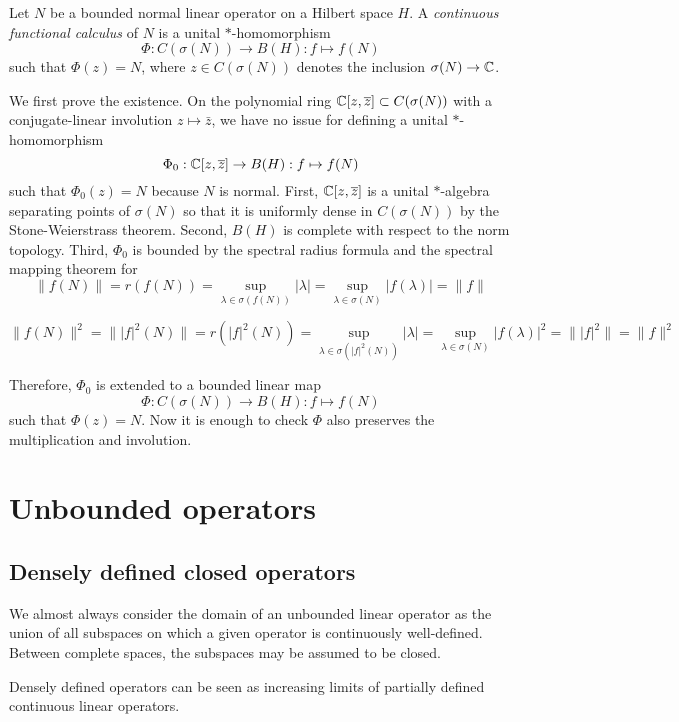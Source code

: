 \documentclass{../../large}
\begin{document}
\begin{prb}
Let $N$ be a bounded normal linear operator on a Hilbert space $H$.
A \emph{continuous functional calculus} of $N$ is a unital $*$-homomorphism
\[\Phi:C(\sigma(N))\to B(H):f\mapsto f(N)\]
such that $\Phi(z)=N$, where $z\in C(\sigma(N))$ denotes the inclusion $\sigma(N)\to\mathbb{C}$.
\end{prb}
\begin{pf}

We first prove the existence.
On the polynomial ring $\mathbb{C}[z,\overline z]\subset C(\sigma(N))$ with a conjugate-linear involution $z\mapsto\bar z$, we have no issue for defining a unital $*$-homomorphism
\[\Phi_0:\mathbb{C}[z,\overline z]\to B(H):f\mapsto f(N)\]
such that $\Phi_0(z)=N$ because $N$ is normal.
First, $\mathbb{C}[z,\overline z]$ is a unital $*$-algebra separating points of $\sigma(N)$ so that it is uniformly dense in $C(\sigma(N))$ by the Stone-Weierstrass theorem.
Second, $B(H)$ is complete with respect to the norm topology.
Third, $\Phi_0$ is bounded by the spectral radius formula and the spectral mapping theorem for 
\[\|f(N)\|=r(f(N))=\sup_{\lambda\in\sigma(f(N))}|\lambda|=\sup_{\lambda\in\sigma(N)}|f(\lambda)|=\|f\|\]

\[\|f(N)\|^2=\||f|^2(N)\|=r(|f|^2(N))=\sup_{\lambda\in\sigma(|f|^2(N))}|\lambda|=\sup_{\lambda\in\sigma(N)}|f(\lambda)|^2=\||f|^2\|=\|f\|^2\]


Therefore, $\Phi_0$ is extended to a bounded linear map
\[\Phi:C(\sigma(N))\to B(H):f\mapsto f(N)\]
such that $\Phi(z)=N$.
Now it is enough to check $\Phi$ also preserves the multiplication and involution.



\end{pf}


\chapter{Unbounded operators}

\section{Densely defined closed operators}


We almost always consider the domain of an unbounded linear operator as the union of all subspaces on which a given operator is continuously well-defined.
Between complete spaces, the subspaces may be assumed to be closed.

Densely defined operators can be seen as increasing limits of partially defined continuous linear operators.
\end{document}
